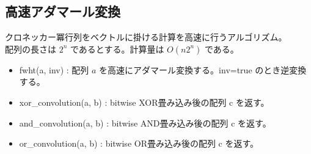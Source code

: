 \subsection{高速アダマール変換}
クロネッカー冪行列をベクトルに掛ける計算を高速に行うアルゴリズム。\\
配列の長さは $2^n$ であるとする。計算量は $O(n 2^n)$ である。
\begin{itemize}
    \item fwht(a, inv) : 配列 $a$ を高速にアダマール変換する。inv=true のとき逆変換する。
    \item xor\_convolution(a, b) : bitwise XOR畳み込み後の配列 c を返す。
    \item and\_convolution(a, b) : bitwise AND畳み込み後の配列 c を返す。
    \item or\_convolution(a, b) : bitwise OR畳み込み後の配列 c を返す。
\end{itemize}
